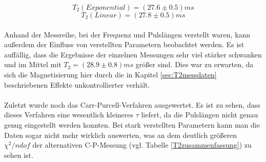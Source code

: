 \documentclass[12pt,a4paper]{article}
\begin{document}
\begin{equation*}
\boxed{T_2(Exponential) = (27.6\pm 0.5)ms}
\end{equation*}
\begin{equation*}
\boxed{T_2(Linear) = (27.8\pm 0.5)ms}
\end{equation*}\\

Anhand der Messreihe, bei der Frequenz und Pulslängen verstellt waren, kann außerdem der Einfluss von verstellten Parametern beobachtet werden. Es ist auffällig, dass die Ergebnisse der einzelnen Messungen sehr viel stärker schwanken und im Mittel mit $T_2 = (28.9\pm0.8)ms$ größer sind. Dies war zu erwarten, da sich die Magnetisierung hier durch die in Kapitel \ref{sec:T2messdaten} beschriebenen Effekte unkontrollierter verhält.\\
\\
Zuletzt wurde noch das Carr-Purcell-Verfahren ausgewertet. Es ist zu sehen, dass dieses Verfahren eine wesentlich kleineres $\tau$ liefert, da die Pulslängen nicht genau genug eingestellt werden konnten. Bei stark verstellten Parametern kann man die Daten sogar nicht mehr wirklich auswerten, was an dem deutlich größeren $\chi^2/ndof$ der alternativen C-P-Messung (vgl. Tabelle \ref{T2zusammenfassung}) zu sehen ist.
\end{document}
